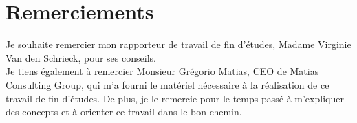 \section*{Remerciements}
\thispagestyle{empty}
Je souhaite remercier mon rapporteur de travail de fin d'études, Madame Virginie Van den Schrieck, pour ses conseils. \\

Je tiens également à remercier Monsieur Grégorio Matias, CEO de Matias Consulting Group, qui m'a fourni le matériel nécessaire à la réalisation de ce travail de fin d'études.
De plus, je le remercie pour le temps passé à m'expliquer des concepts et à orienter ce travail dans le bon chemin.

\clearpage